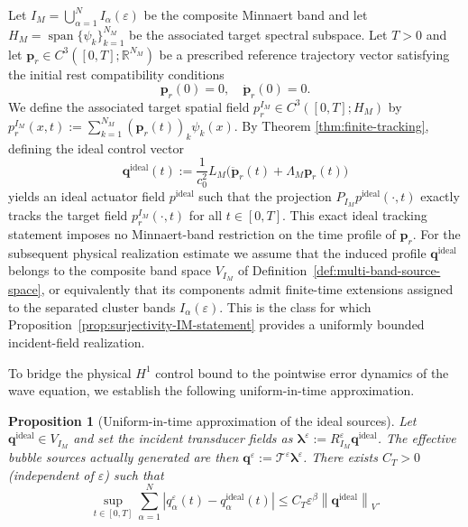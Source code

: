 \documentclass[11pt,a4paper]{article}
\numberwithin{equation}{section}
\newtheorem{proposition}[theorem]{Proposition}
\newcommand{\veps}{\varepsilon}
\newcommand{\norm}[1]{\left\lVert #1 \right\rVert}
\newcommand{\abs}[1]{\left\lvert #1 \right\rvert}
\begin{document}
\medskip
\noindent
Let $I_M = \bigcup_{\alpha=1}^N I_\alpha(\varepsilon)$ be the composite Minnaert band and let $H_M = \operatorname{span}\{\psi_k\}_{k=1}^{N_M}$ be the associated target spectral subspace. Let $T>0$ and let $\bm{p}_r \in C^3([0,T]; \mathbb{R}^{N_M})$ be a prescribed reference trajectory vector satisfying the initial rest compatibility conditions 
$$ \bm{p}_r(0) = 0, \quad \dot{\bm{p}}_r(0) = 0. $$ 
We define the associated target spatial field $p_r^{I_M} \in C^3([0,T]; H_M)$ by $p_r^{I_M}(x,t) := \sum_{k=1}^{N_M} (\bm{p}_r(t))_k \psi_k(x)$.
\newline
By Theorem \ref{thm:finite-tracking}, defining the ideal control vector
\[
\mathbf{q}^{\mathrm{ideal}}(t) := \frac{1}{c_0^2} L_M \bigl(\ddot{\bm{p}}_r(t) + \Lambda_M \bm{p}_r(t)\bigr)
\]
yields an ideal actuator field $p^{\mathrm{ideal}}$ such that the projection $P_{I_M} p^{\mathrm{ideal}}(\cdot,t)$ exactly tracks the target field $p_r^{I_M}(\cdot,t)$ for all $t \in [0,T]$.
This exact ideal tracking statement imposes no Minnaert-band restriction on the time profile of $\bm p_r$. For the subsequent physical realization estimate we assume that the induced profile $\mathbf q^{\mathrm{ideal}}$ belongs to the composite band space $V_{I_M}$ of Definition~\ref{def:multi-band-source-space}, or equivalently that its components admit finite-time extensions assigned to the separated cluster bands $I_\alpha(\varepsilon)$. This is the class for which Proposition~\ref{prop:surjectivity-IM-statement} provides a uniformly bounded incident-field realization.

\noindent
To bridge the physical $H^1$ control bound to the pointwise error dynamics of the wave equation, we establish the following uniform-in-time approximation.

\begin{proposition}[Uniform-in-time approximation of the ideal sources]
\label{prop:surjectivity-to-qdiff-J}
Let $\mathbf{q}^{\mathrm{ideal}}\in V_{I_M}$ and set the incident transducer fields as $\bm{\lambda}^\veps:=R_{I_M}^\veps \mathbf{q}^{\mathrm{ideal}}$. The effective bubble sources actually generated are then $\mathbf{q}^\veps:=\mathcal{T}^\veps\bm{\lambda}^\veps$. There exists $C_T>0$ (independent of $\veps$) such that
\begin{equation}
\label{eq:q-diff-Linfty-J}
 \sup_{t\in[0,T]}
 \sum_{\alpha=1}^N\abs{q_\alpha^\veps(t)-q_\alpha^{\mathrm{ideal}}(t)}
 \le C_T\veps^\beta\norm{\mathbf{q}^{\mathrm{ideal}}}_V.
\end{equation}
\end{proposition}
\end{document}
